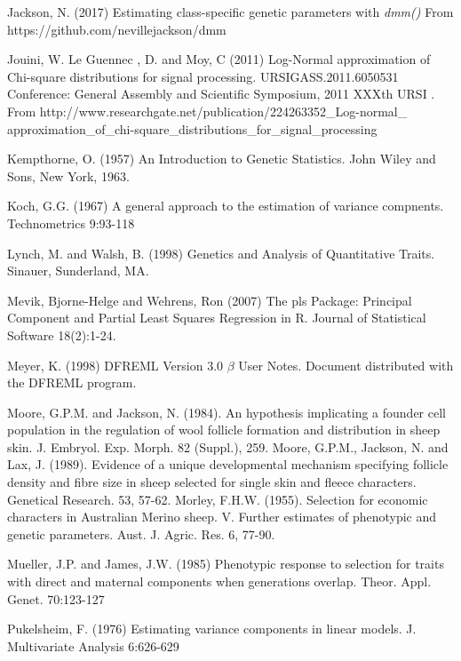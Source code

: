 \documentclass[titlepage]{article}  %
\begin{document}
\begin{thebibliography}{99}
Jackson, N. (2017) Estimating class-specific genetic parameters with {\em dmm()}    From https://github.com/nevillejackson/dmm

Jouini, W. Le Guennec , D. and Moy, C  (2011) Log-Normal approximation of
    Chi-square distributions for signal processing. 
    URSIGASS.2011.6050531 Conference: General Assembly and Scientific Symposium,
    2011 XXXth URSI .
    From http://www.researchgate.net/publication/224263352\_Log-normal\_
    approximation\_of\_chi-square\_distributions\_for\_signal\_processing

Kempthorne, O. (1957) An Introduction to Genetic Statistics.
    John Wiley and Sons, New York, 1963.

Koch, G.G. (1967) A general approach to the estimation of variance compnents. 
    Technometrics 9:93-118

Lynch, M. and Walsh, B. (1998) Genetics and Analysis of Quantitative Traits. 
    Sinauer, Sunderland, MA.

Mevik, Bjorne-Helge and Wehrens, Ron (2007) The pls Package: Principal 
    Component and Partial Least Squares Regression in R.
    Journal of Statistical Software 18(2):1-24.

Meyer, K. (1998) DFREML Version 3.0 $\beta$ User Notes. Document distributed
    with the DFREML program.

Moore, G.P.M. and Jackson, N. (1984).  An hypothesis implicating a founder
    cell population in the regulation of wool follicle formation and
    distribution in sheep skin.  J. Embryol. Exp. Morph. 82 (Suppl.), 259.
Moore, G.P.M., Jackson, N. and Lax, J. (1989).  Evidence of a unique
    developmental mechanism specifying follicle density and fibre size in
    sheep selected for single skin and fleece characters.  Genetical
    Research.  53, 57-62.
Morley, F.H.W. (1955).  Selection for economic characters in Australian
    Merino sheep.  V. Further estimates of phenotypic and genetic
    parameters.  Aust. J. Agric. Res. 6, 77-90.

Mueller, J.P. and James, J.W. (1985) Phenotypic response to selection for
    traits with direct and maternal components when generations overlap.
    Theor. Appl. Genet. 70:123-127

Pukelsheim, F. (1976) Estimating variance components in linear models.
    J. Multivariate Analysis 6:626-629


\end{thebibliography}
\end{document}
